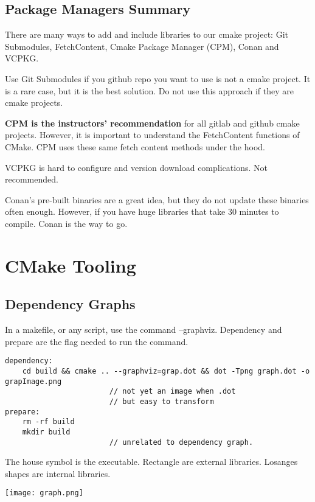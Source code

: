 \section{Package Managers Summary}

There are many ways to add and include libraries to our cmake project: Git Submodules, FetchContent,
Cmake Package Manager (CPM), Conan and VCPKG.

Use Git Submodules if you github repo you want to use is not a cmake project. It is a rare case, but it is
the best solution. Do not use this approach if they are cmake projects.


\textbf{CPM is the instructors' recommendation} for all gitlab and github cmake projects. However, it is important to understand the FetchContent functions of 
CMake. CPM uses these same fetch content methods under the hood.


VCPKG is hard to configure and version download complications. Not recommended.

Conan's pre-built binaries are a great idea, but they do not update these binaries often enough. 
However, if you have huge libraries that take 30 minutes to compile. Conan is the way to go.

\chapter{CMake Tooling}

\section{Dependency Graphs}

In a makefile, or any script, use the command --graphviz. Dependency and prepare are the flag needed to run the command.

\begin{verbatim}
dependency:
    cd build && cmake .. --graphviz=grap.dot && dot -Tpng graph.dot -o grapImage.png
                        // not yet an image when .dot
                        // but easy to transform
prepare:
    rm -rf build
    mkdir build
                        // unrelated to dependency graph.
\end{verbatim}

The house symbol is the executable. Rectangle are external libraries. Losanges shapes are internal libraries.

\begin{center}
    \texttt{[image: graph.png]}
\end{center}


